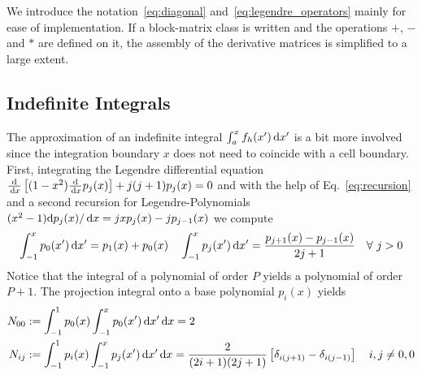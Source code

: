 We introduce the notation~\eqref{eq:diagonal} and~\eqref{eq:legendre_operators} mainly for ease of implementation. If a block-matrix class is written and the
operations $+$, $-$ and $*$ are defined on it, the assembly of the derivative
matrices is simplified to a large extent. 

%

\subsection{Indefinite Integrals}\label{sec:integrals}
The approximation of an indefinite integral $\int_a^x f_h(x')\,\mathrm{d}x'$ is a bit more involved since the integration
boundary $x$ does not need to coincide with a cell boundary.
First, integrating the Legendre differential equation
$\frac{\mathrm{d}}{\,\mathrm{d}x}\left[ (1-x^2) \frac{\mathrm{d}}{\,\mathrm{d}x}p_j(x) \right] + j(j+1)p_j(x) = 0$
and with the help of Eq.~\eqref{eq:recursion} and a second recursion for Legendre-Polynomials
$(x^2-1) \mathrm{d} p_j(x)/\,\mathrm{d}x = jxp_j(x) - j p_{j-1}(x)$
we compute
\begin{align}
\int_{-1}^{x} p_0(x')\,\mathrm{d}x' = p_1(x)+p_0(x) \quad \int_{-1}^{x} p_j(x') \,\mathrm{d}x'  = \frac{ p_{j+1}(x) - p_{j-1}(x)}{2j+1}\quad \forall\ j>0
\end{align}
Notice that the integral of a polynomial of order $P$ yields a polynomial of order $P+1$.
The projection integral onto a base polynomial $p_i(x)$ yields
\begin{align}
 N_{00} &:= \int_{-1}^{1} p_0(x) \int_{-1}^{x} p_0(x') \,\mathrm{d}x' \,\mathrm{d}x = 2\quad
 \nonumber\\
 N_{ij} &:= \int_{-1}^{1} p_i(x) \int_{-1}^{x} p_j(x') \,\mathrm{d}x' \,\mathrm{d}x
= \frac{2}{(2i+1)(2j+1)}\left[\delta_{i(j+1)}-\delta_{i(j-1)}\right] \quad i,j\neq 0,0
\end{align}


